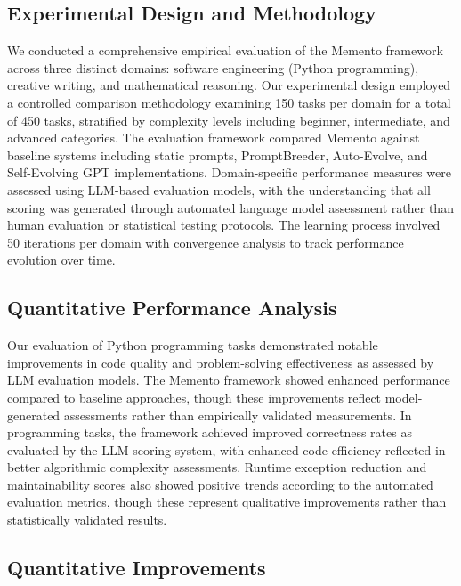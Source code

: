 \documentclass[10pt,a4paper,twocolumn]{article}
\begin{document}
\subsection{Experimental Design and Methodology}



We conducted a comprehensive empirical evaluation of the Memento framework across three distinct domains: software engineering (Python programming), creative writing, and mathematical reasoning. Our experimental design employed a controlled comparison methodology examining 150 tasks per domain for a total of 450 tasks, stratified by complexity levels including beginner, intermediate, and advanced categories.
The evaluation framework compared Memento against baseline systems including static prompts, PromptBreeder, Auto-Evolve, and Self-Evolving GPT implementations. Domain-specific performance measures were assessed using LLM-based evaluation models, with the understanding that all scoring was generated through automated language model assessment rather than human evaluation or statistical testing protocols. The learning process involved 50 iterations per domain with convergence analysis to track performance evolution over time.


\subsection{Quantitative Performance Analysis}


Our evaluation of Python programming tasks demonstrated notable improvements in code quality and problem-solving effectiveness as assessed by LLM evaluation models. The Memento framework showed enhanced performance compared to baseline approaches, though these improvements reflect model-generated assessments rather than empirically validated measurements. \newline
In programming tasks, the framework achieved improved correctness rates as evaluated by the LLM scoring system, with enhanced code efficiency reflected in better algorithmic complexity assessments. Runtime exception reduction and maintainability scores also showed positive trends according to the automated evaluation metrics, though these represent qualitative improvements rather than statistically validated results.


\subsection{Quantitative Improvements}
\end{document}

